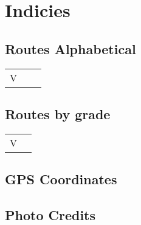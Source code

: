 \chapter{Indicies}
\section{Routes Alphabetical}
\begin{center}
\begin{supertabular}{llr}
 V&&  \\
\end{supertabular}
\end{center}
\section{Routes by grade}
\begin{center}
\begin{supertabular}{lr}
V  &  \\
\end{supertabular}
\end{center}
\section{GPS Coordinates}
\section{Photo Credits}